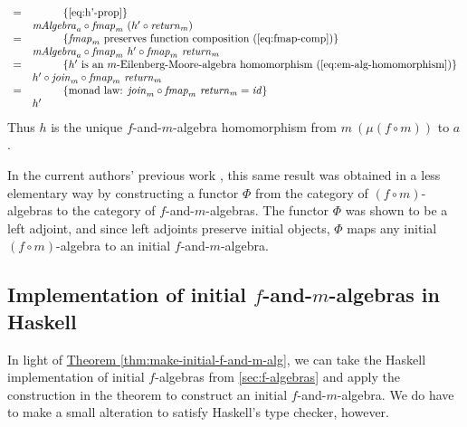\documentclass{jfp1}
\newcommand{\eqAnnotationS}[1]{\hspace{1cm}\left\{\textrm{#1}\right\}}
\newcommand{\thmref}[1]{\hyperref[#1]{Theorem \ref*{#1}}}
\begin{document}
\begin{proof*}
\begin{enumerate}
\begin{displaymath}
\begin{array}{cl}
        =&\eqAnnotationS{\autoref{eq:h'-prop}} \\
        &\mathit{mAlgebra}_a \circ \mathit{fmap}_m~(h' \circ \mathit{return}_m) \\
        =&\eqAnnotationS{$\mathit{fmap}_m$ preserves function composition (\autoref{eq:fmap-comp})} \\
        &\mathit{mAlgebra}_a \circ \mathit{fmap}_m~{h'} \circ \mathit{fmap}_m~\mathit{return}_m \\
        =&\eqAnnotationS{$h'$ is an $m$-Eilenberg-Moore-algebra homomorphism (\autoref{eq:em-alg-homomorphism})} \\
        &h' \circ \mathit{join}_m \circ \mathit{fmap}_m~\mathit{return}_m \\
        =&\eqAnnotationS{monad law: $\mathit{join}_m \circ \mathit{fmap}_m~\mathit{return}_m = \mathit{id}$} \\
        &h'
      \end{array}
    \end{displaymath}
    Thus $h$ is the unique $f$-and-$m$-algebra homomorphism from
    $m~(\mu (f \circ m))$ to $a$. \mathproofbox
  \end{enumerate}
\end{proof*}

In the current authors' previous work \cite{atkey12fibrational}, this
same result was obtained in a less elementary way by constructing a
functor $\Phi$ from the category of $(f \circ m)$-algebras to the
category of $f$-and-$m$-algebras. The functor $\Phi$ was shown to be a
left adjoint, and since left adjoints preserve initial objects, $\Phi$
maps any initial $(f \circ m)$-algebra to an initial
$f$-and-$m$-algebra.


\subsection{Implementation of initial $f$-and-$m$-algebras in Haskell}
\label{sec:f-and-m-alg-impl}

\newcommand{\fcompose}{\mathop{\mathord:\circ\mathord:}}

In light of \thmref{thm:make-initial-f-and-m-alg}, we can take the
Haskell implementation of initial $f$-algebras from
\autoref{sec:f-algebras} and apply the construction in the
theorem to construct an initial $f$-and-$m$-algebra. We do have to
make a small alteration to satisfy Haskell's type checker, however.
\end{document}

